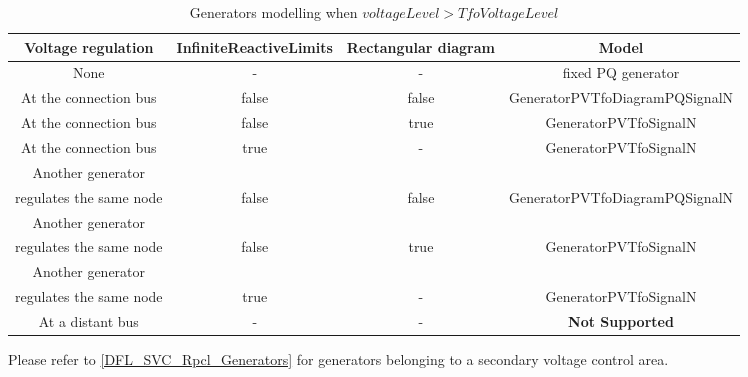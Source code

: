 \documentclass[a4paper, 12pt]{report}
\begin{document}
\begin{table}[h!]
\center
\begin{tabular}{ c | c | c | c}
\toprule
\scriptsize{\textbf{{Voltage regulation}}} & \scriptsize{\textbf{{InfiniteReactiveLimits}}} & \scriptsize{\textbf{{Rectangular diagram}}} & \scriptsize{\textbf{{Model}}}\\
\midrule
\rowcolor{white}
 \scriptsize{None}  & \scriptsize{-} & \scriptsize{-} & \scriptsize{fixed PQ generator} \\
\rowcolor{gray!10}
 \scriptsize{At the connection bus} & \scriptsize{false} & \scriptsize{false} & \scriptsize{GeneratorPVTfoDiagramPQSignalN} \\
\rowcolor{white}
 \scriptsize{At the connection bus} & \scriptsize{false} & \scriptsize{true} & \scriptsize{GeneratorPVTfoSignalN} \\
\rowcolor{gray!10}
 \scriptsize{At the connection bus} & \scriptsize{true} & \scriptsize{-} & \scriptsize{GeneratorPVTfoSignalN} \\
\rowcolor{white}
\scriptsize{Another generator}&  &  & \\
\rowcolor{white}
\scriptsize{regulates the same node} & \multirow{-2}{*}{\scriptsize{false}} & \multirow{-2}{*}{\scriptsize{false}} & \multirow{-2}{*}{\scriptsize{GeneratorPVTfoDiagramPQSignalN}}  \\
\rowcolor{gray!10}
\scriptsize{Another generator}&  & & \\
\rowcolor{gray!10}
\scriptsize{regulates the same node} & \multirow{-2}{*}{\scriptsize{false}} & \multirow{-2}{*}{\scriptsize{true}} & \multirow{-2}{*}{\scriptsize{GeneratorPVTfoSignalN}} \\
\rowcolor{white}
\scriptsize{Another generator}&  & &  \\
\rowcolor{white}
\scriptsize{regulates the same node} & \multirow{-2}{*}{\scriptsize{true}} & \multirow{-2}{*}{\scriptsize{-}} & \multirow{-2}{*}{\scriptsize{GeneratorPVTfoSignalN}} \\
\rowcolor{gray!10}
 \scriptsize{At a distant bus} & \scriptsize{-} & \scriptsize{-} & \scriptsize{\bf{Not Supported}} \\
\bottomrule
\end{tabular}
\caption{Generators modelling when $voltageLevel > TfoVoltageLevel$}
\label{tab:generators_modelling_tfo}
\end{table}

Please refer to \ref{DFL_SVC_Rpcl_Generators} for generators belonging to a secondary voltage control area.\\
\end{document}
